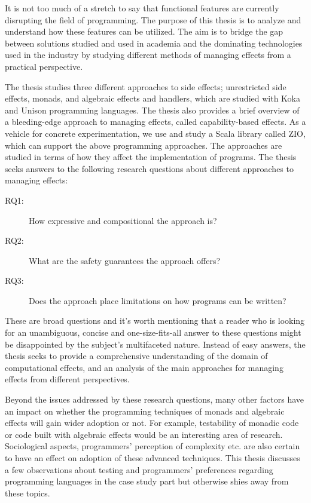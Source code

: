 It is not too much of a stretch to say that functional features are currently disrupting the field of programming. The purpose of this thesis is to analyze and understand how these features can be utilized. The aim is to bridge the gap between solutions studied and used in academia and the dominating technologies used in the industry by studying different methods of managing effects from a practical perspective.

The thesis studies three different approaches to side effects; unrestricted side effects, monads, and algebraic effects and handlers, which are studied with Koka and Unison programming languages. The thesis also provides a brief overview of a bleeding-edge approach to managing effects, called capability-based effects. As a vehicle for concrete experimentation, we use and study a Scala library called ZIO, which can support the above programming approaches. The approaches are studied in terms of how they affect the implementation of programs. The thesis seeks answers to the following research questions about different approaches to managing effects:
\begin{description}
    \item[RQ1:] How expressive and compositional the approach is?
    \item[RQ2:] What are the safety guarantees the approach offers?
    \item[RQ3:] Does the approach place limitations on how programs can be written?
\end{description}

These are broad questions and it's worth mentioning that a reader who is looking for an unambiguous, concise and one-size-fits-all answer to these questions might be disappointed by the subject's multifaceted nature. Instead of easy answers, the thesis seeks to provide a comprehensive understanding of the domain of computational effects, and an analysis of the main approaches for managing effects from different perspectives.

Beyond the issues addressed by these research questions, many other factors have an impact on whether the programming techniques of monads and algebraic effects will gain wider adoption or not. For example, testability of monadic code or code built with algebraic effects would be an interesting area of research. Sociological aspects, programmers' perception of complexity etc. are also certain to have an effect on adoption of these advanced techniques. This thesis discusses a few observations about testing and programmers' preferences regarding programming languages in the case study part but otherwise shies away from these topics.

